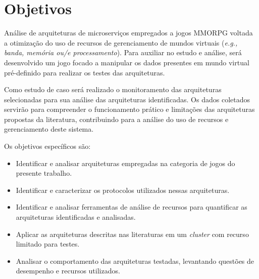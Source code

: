 \section{Objetivos}
\label{obj}

Análise de arquiteturas de microserviços empregados a jogos MMORPG voltada a otimização do uso de recursos de gerenciamento de mundos virtuais (\textit{e.g., banda, memória ou/e processamento}). Para auxiliar no estudo e análise, será desenvolvido um jogo focado a manipular os dados presentes em mundo virtual pré-definido para realizar os testes das arquiteturas.

Como estudo de caso será realizado o monitoramento das arquiteturas selecionadas para sua análise das arquiteturas identificadas. Os dados coletados servirão para compreender o funcionamento prático e limitações das arquiteturas propostas da literatura, contribuindo para a análise do uso de recursos e gerenciamento deste sistema.

Os objetivos específicos são:
\begin{itemize}
    \item Identificar e analisar arquiteturas empregadas na categoria de jogos do presente trabalho.
    \item Identificar e caracterizar os protocolos utilizados nessas arquiteturas.
    \item Identificar e analisar ferramentas de análise de recursos para quantificar as arquiteturas identificadas e analisadas.
    \item Aplicar as arquiteturas descritas nas literaturas em um \textit{cluster} com recurso limitado para testes.
    \item Analisar o comportamento das arquiteturas testadas, levantando questões de desempenho e recursos utilizados.
\end{itemize}
